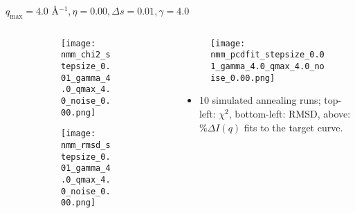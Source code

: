 \documentclass{beamer}
\begin{document}
\begin{frame}{$ q_{\textrm{max}}=4.0 $ \AA $^{-1}, \eta=0.00, \Delta s=0.01, \gamma=4.0$}
	\begin{columns}
		\begin{column}{.5\textwidth}
			\begin{figure}[H]
			\centering
			\begin{subfigure}[b]{\textwidth}
				\centering
				\texttt{[image: nmm\_chi2\_stepsize\_0.01\_gamma\_4.0\_qmax\_4.0\_noise\_0.00.png]}
				\label{fig:}
			\end{subfigure}
			\begin{subfigure}[b]{\textwidth}
				\centering
				\texttt{[image: nmm\_rmsd\_stepsize\_0.01\_gamma\_4.0\_qmax\_4.0\_noise\_0.00.png]}
				\label{fig:}
			\end{subfigure}
			\end{figure}
		\end{column}
		\begin{column}{.5\textwidth}
			\begin{figure}[H]
				\centering
				\texttt{[image: nmm\_pcdfit\_stepsize\_0.01\_gamma\_4.0\_qmax\_4.0\_noise\_0.00.png]}
				\label{fig:}
			\end{figure}
			\begin{itemize}
				\item 10 simulated annealing runs; top-left: $\chi^2$, bottom-left: RMSD, above: $\%\Delta I(q)$ fits to the target curve.
			\end{itemize}
		\end{column}
	\end{columns}
\end{frame}
 
\end{document}
